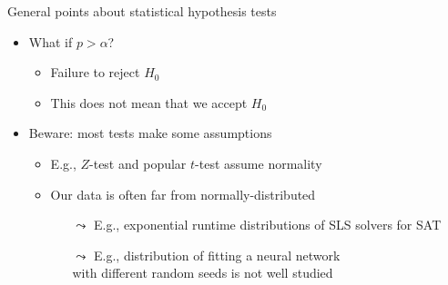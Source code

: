 \begin{frame}[c]{General points about statistical hypothesis tests}

\begin{itemize}
  \item What if $p > \alpha$?
  \begin{itemize}
	  \item \alert{Failure to reject $H_0$}
	  \item \alert{This does not mean that we accept $H_0$}
  \end{itemize}


\pause
\bigskip
  \item Beware: most tests make some assumptions
  \begin{itemize}
	  \item E.g., $Z$-test and popular $t$-test assume \alert{normality}
	  \item Our data is often far from normally-distributed
	  \begin{itemize}
	    \item[$\leadsto$] E.g., exponential runtime distributions of SLS solvers for SAT
	    \item[$\leadsto$] E.g., distribution of fitting a neural network\\ with different random seeds is not well studied
	  \end{itemize}
  \end{itemize}

\end{itemize}

\end{frame}


